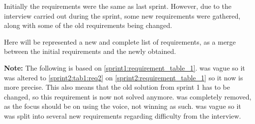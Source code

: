 Initially the requirements were the same as last sprint.
However, due to the interview carried out during the sprint, some new requirements were gathered, along with some of the old requirements being changed.

Here will be represented a new and complete list of requirements, as a merge between the initial requirements and the newly obtained.

\textbf{Note:} The following is based on \cref{sprint1:requirement_table_1}.
  was vague so it was altered to \cref{sprint2:tab1:req2} on \cref{sprint2:requirement_table_1} so it now is more precise.
This also means that the old solution from sprint 1 has to be changed, so this requirement is now not solved anymore.
 was completely removed, as the focus should be on using the voice, not winning as such.
 was vague so it was split into several new requirements regarding difficulty from the interview.

